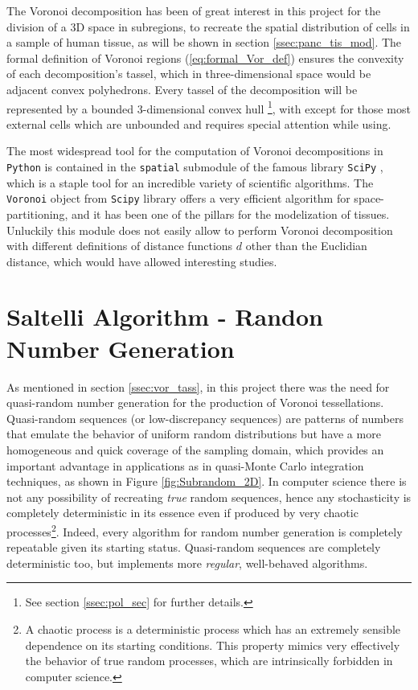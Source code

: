     The Voronoi decomposition has been of great interest in this project for the division of a 3D space in subregions, to recreate the spatial distribution of cells in a sample of human tissue, as will be shown in section \ref{ssec:panc_tis_mod}. The formal definition of Voronoi regions (\ref{eq:formal_Vor_def}) ensures the convexity of each decomposition's tassel, which in three-dimensional space would be adjacent convex polyhedrons. Every tassel of the decomposition will be represented by a bounded 3-dimensional convex hull \footnote{See section \ref{ssec:pol_sec} for further details.}, with except for those most external cells which are unbounded and requires special attention while using.

    The most widespread tool for the computation of Voronoi decompositions in \texttt{Python} is contained in the \texttt{spatial} submodule of the famous library \texttt{SciPy} \cite{2020SciPy-NMeth}, which is a staple tool for an incredible variety of scientific algorithms. The \texttt{Voronoi} object from \texttt{Scipy} library offers a very efficient algorithm for space-partitioning, and it has been one of the pillars for the modelization of tissues. Unluckily this module does not easily allow to perform Voronoi decomposition with different definitions of distance functions $d$ other than the Euclidian distance, which would have allowed interesting studies.

\section{Saltelli Algorithm - Randon Number Generation} \label{ssec:saltelli}
    As mentioned in section \ref{ssec:vor_tass}, in this project there was the need for quasi-random number generation for the production of Voronoi tessellations. Quasi-random sequences (or low-discrepancy sequences) are patterns of numbers that emulate the behavior of uniform random distributions but have a more homogeneous and quick coverage of the sampling domain, which provides an important advantage in applications as in quasi-Monte Carlo integration techniques, as shown in Figure \ref{fig:Subrandom_2D}. In computer science there is not any possibility of recreating \textit{true} random sequences, hence any stochasticity is completely deterministic in its essence even if produced by very chaotic processes\footnote{A chaotic process is a deterministic process which has an extremely sensible dependence on its starting conditions. This property mimics very effectively the behavior of true random processes, which are intrinsically forbidden in computer science.}. Indeed, every algorithm for random number generation is completely repeatable given its starting status. Quasi-random sequences are completely deterministic too, but implements more \textit{regular}, well-behaved algorithms.

